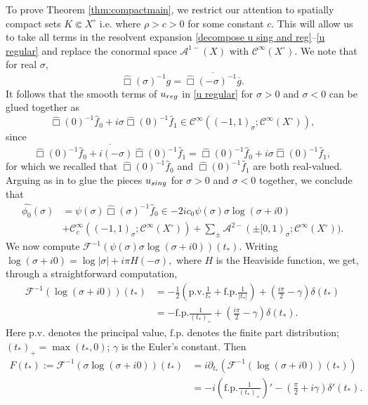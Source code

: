 \documentclass[10pt,a4paper,reqno]{amsart}
\newcommand{\CI}{\mathcal{C}^\infty}
\newcommand{\CcI}{\mathcal{C}_c^\infty}
\newcommand{\A}{\mathcal{A}}
\newcommand{\ti}{\tilde}
\let\pminus\pm
\renewcommand{\pm}{\phi_{\le m}}
\theoremstyle{definition}
\theoremstyle{remark}
\numberwithin{equation}{section}
\newcommand{\ts}{t_*}
\newcommand{\wh}{\widehat}
\begin{document}
To prove Theorem \ref{thm:compactmain}, we restrict our attention to spatially compact sets $K\Subset X^\circ$ i.e. where $\rho>c>0$ for some constant $c$. This will allow us to take all terms in the resolvent expansion \eqref{decompose u sing and reg}--\eqref{u regular} and replace the conormal space $\A^{1-}(X)$ with $\CI(X^\circ)$. We note that for real $\sigma$,
\begin{equation}
\label{resolvent negative sigma 0}
    \wh\Box(\sigma)^{-1} g = \overline{\wh\Box(-\sigma)^{-1}\overline{g}}.
\end{equation}
It follows that the smooth terms of $u_{\rm{reg}}$ in \eqref{u regular} for $\sigma >0$ and $\sigma<0$ can be glued together as
\[
    \wh\Box(0)^{-1} \wh{f}_0 + i\sigma \wh\Box(0)^{-1}\ti{f_1} \in\CI((-1,1)_\sigma;\CI(X^\circ)),
\]
since 
\[
	\overline{\wh\Box(0)^{-1} \wh{f}_0 + i(-\sigma)\wh\Box(0)^{-1}\ti{f_1}} = \wh\Box(0)^{-1} \wh{f}_0 + i\sigma \wh\Box(0)^{-1}\ti{f_1},
\]
for which we recalled that $\wh\Box(0)^{-1} \wh{f}_0$ and $\wh\Box(0)^{-1}\ti{f_1}$ are both real-valued. Arguing as in \cite[Theorem 3.4]{Hin22} to glue the pieces $u_{\rm{sing}}$ for $\sigma>0$ and $\sigma<0$ together, we conclude that
\begin{equation}
\label{eq:phi0}
\begin{split}
     \widehat{\phi_0}(\sigma)&=\psi(\sigma) \wh\Box(\sigma)^{-1} \wh{f}_0 \in -2ic_0\psi(\sigma)\sigma\log(\sigma+i0)\\ &+\CcI((-1,1)_\sigma;\CI(X^\circ)) +\sum_{\pminus} \A^{2-}(\pminus[0,1)_\sigma;\CI(X^\circ)).
\end{split}
\end{equation}
We now compute $\mathcal{F}^{-1} (\psi(\sigma)\sigma\log(\sigma+i0))(\ts)$. Writing $\log(\sigma+i0) = \log|\sigma| + i\pi H(-\sigma),$
where $H$ is the Heaviside function, we get, through a straightforward computation, 
\[
\begin{split}
    \mathcal{F}^{-1} (\log(\sigma+i0)) (\ts)
    &= -\frac{1}{2} \left( \mathrm{p.v.} \frac{1}{\ts} + \mathrm{f.p.} \frac{1}{|\ts|} \right) + \left( \frac{i\pi}{2} - \gamma \right)\delta(\ts) \\
    &= - \mathrm{f.p.} \frac{1}{(\ts)_+} + \left( \frac{i\pi}{2} - \gamma \right)\delta(\ts).
\end{split}
\]
Here $\mathrm{p.v.}$ denotes the principal value, $\mathrm{f.p.}$ denotes the finite part distribution; $(\ts)_+ = \max(\ts,0)$; $\gamma$ is the Euler's constant. Then
\begin{equation}
\label{IFTsigmalog(sigma+i0)}
\begin{split}
    F(t_*) := \mathcal{F}^{-1} (\sigma\log(\sigma+i0))(\ts) 
    &= i\partial_{\ts} \left(\mathcal{F}^{-1} (\log(\sigma+i0))(\ts)\right) \\
    &= -i \left(\mathrm{f.p.} \frac{1}{(\ts)_+}\right)' - \left( \frac{\pi}{2} + i\gamma \right)\delta'(\ts) .
\end{split} 
\end{equation}
\end{document}
